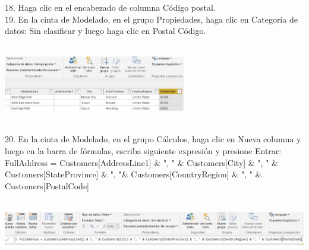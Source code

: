 \documentclass[12pt,letterpaper]{article}
\begin{document}
\begin{flushleft}
\begin{itemize}
18. Haga clic en el encabezado de columna Código postal.\\
19. En la cinta de Modelado, en el grupo Propiedades, haga clic en Categoría de datos: Sin clasificar y luego haga clic en Postal
Código.\\
\textbf{ }\\
\begin{center}
	\includegraphics[width=8cm]{./Imagenes/image16} 
	\end{center}
\textbf{ }\\

20. En la cinta de Modelado, en el grupo Cálculos, haga clic en Nueva columna y luego en la barra de fórmulas, escriba
siguiente expresión y presione Entrar:\\ FullAddress = Customers[AddressLine1] \& ", " \& Customers[City] \& ", " \&
Customers[StateProvince] \& ", "\& Customers[CountryRegion] \& ", " \&
Customers[PostalCode]\\
\textbf{ }\\
\begin{center}
	\includegraphics[width=16cm]{./Imagenes/image17} 
	\end{center}
\textbf{ }\\


\end{itemize}
\end{flushleft}
\end{document}
